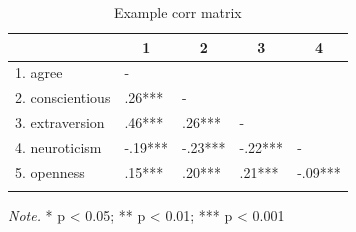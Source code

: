 \documentclass[
  english,
  man]{apa6}
\begin{document}
\begin{table}[tbp]

\begin{center}
\begin{threeparttable}

\caption{\label{tab:scale-intercors-tbl}Example corr matrix}

\begin{tabular}{lllll}
\toprule
 & \multicolumn{1}{c}{1} & \multicolumn{1}{c}{2} & \multicolumn{1}{c}{3} & \multicolumn{1}{c}{4}\\
\midrule
1. agree & - &  &  & \\
2. conscientious & .26*** & - &  & \\
3. extraversion & .46*** & .26*** & - & \\
4. neuroticism & -.19*** & -.23*** & -.22*** & -\\
5. openness & .15*** & .20*** & .21*** & -.09***\\
\bottomrule
\addlinespace
\end{tabular}

\begin{tablenotes}[para]
\normalsize{\textit{Note.} * p < 0.05; ** p < 0.01; *** p < 0.001}
\end{tablenotes}

\end{threeparttable}
\end{center}

\end{table}
\end{document}
